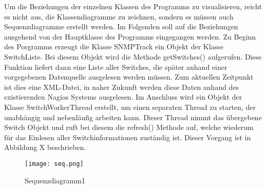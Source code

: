 Um die Beziehungen der einzelnen Klassen des Programms zu visualisieren, reicht es nicht aus, die Klassendiagramme zu zeichnen, sondern es müssen auch Sequenzdiagramme erstellt werden.
Im Folgenden soll auf die Beziehungen ausgehend von der Hauptklasse des Programms eingegangen werden.
Zu Beginn des Porgramms erzeugt die Klasse SNMPTrack ein Objekt der Klasse SwitchListe.
Bei diesem Objekt wird die Methode getSwitches() aufgerufen.
Diese Funktion liefert dann eine Liste aller Switches, die später anhand einer vorgegebenen Datenquelle ausgelesen werden müssen.
Zum aktuellen Zeitpunkt ist dies eine XML-Datei, in naher Zukunft werden diese Daten anhand des existierenden Nagios Systems ausgelesen. Im Anschluss wird ein Objekt der Klasse SwitchWorkerThread erstellt, um einen separaten Thread zu starten, der unabhängig und nebenläufig arbeiten kann. Dieser Thread nimmt das übergebene Switch Objekt und ruft bei diesem die refresh() Methode auf, welche wiederum für das Einlesen aller Switchinformationen zuständig ist. Dieser Vorgang ist in Abbildung X beschrieben.


\begin{figure}[H]
\centering
\texttt{[image: seq.png]}
\caption{Sequenzdiagramm1}
\label{fig:sequecediagram1}
\end{figure}

